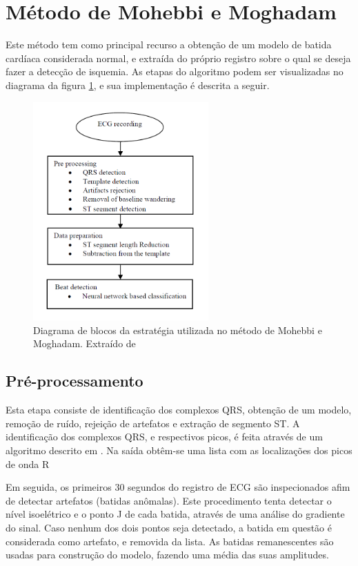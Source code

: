 
\section{Método de Mohebbi e Moghadam}
\label{sec:section3}
Este método tem como principal recurso a obtenção de um modelo de batida cardíaca considerada normal, e extraída do próprio registro sobre o qual se deseja fazer a detecção de isquemia. As etapas do algoritmo podem ser visualizadas no diagrama da figura \ref{fig:mohebbi_01}, e sua implementação é descrita a seguir.

\begin{figure}[ht]
    \centering
    \includegraphics[width=0.6\textwidth]{figures/mohebbi_01.png}
    \caption{Diagrama de blocos da estratégia utilizada no método de Mohebbi e Moghadam. Extraído de \cite{Mohebbi07}}
    \label{fig:mohebbi_01}
\end{figure}

\subsection{Pré-processamento}
Esta etapa consiste de identificação dos complexos QRS, obtenção de um modelo, remoção de ruído, rejeição de artefatos e extração de segmento ST. A identificação dos complexos QRS, e respectivos picos, é feita através de um algoritmo descrito em \cite{Tompkins93}. Na saída obtêm-se uma lista com as localizações dos picos de onda R

Em seguida, os primeiros 30 segundos do registro de ECG são inspecionados afim de detectar artefatos (batidas anômalas). Este procedimento tenta detectar o nível isoelétrico e o ponto J de cada batida, através de uma análise do gradiente do sinal. Caso nenhum dos dois pontos seja detectado, a batida em questão é considerada como artefato, e removida da lista. As batidas remanescentes são usadas para construção do modelo, fazendo uma média das suas amplitudes.

